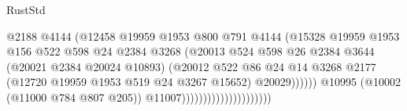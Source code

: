 \begin{lexlean}{RustStd}
\begin{coremodule}
                                                  @2188
                                                  @4144
                                                  (@12458
                                                    @19959
                                                    @1953
                                                    @800
                                                    @791
                                                    @4144
                                                    (@15328
                                                      @19959
                                                      @1953
                                                      @156
                                                      @522
                                                      @598
                                                      @24
                                                      @2384
                                                      @3268
                                                      (@20013
                                                        @524
                                                        @598
                                                        @26
                                                        @2384
                                                        @3644
                                                        (@20021 @2384 @20024 @10893)
                                                        (@20012
                                                          @522
                                                          @86
                                                          @24
                                                          @14
                                                          @3268
                                                          @2177
                                                          (@12720
                                                            @19959
                                                            @1953
                                                            @519
                                                            @24
                                                            @3267
                                                            @15652)
                                                          @20029))))))
                                              @10995
                                              (@10002 (@11000 @784 @807 @205))
                                              @11007)))))))))))))))))))))

\end{coremodule}
\end{lexlean}
